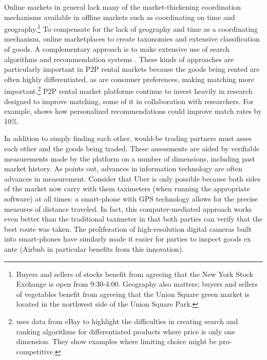 \documentclass[11pt]{article}
\begin{document}
Online markets in general lack many of the market-thickening coordination mechanisms available in offline markets such as coordinating on time and geography.\footnote{
  Buyers and sellers of stocks benefit from agreeing that the New York Stock Exchange is open from 9:30-4:00.
  Geography also matters; buyers and sellers of vegetables benefit from agreeing that the Union Square green market is located in the northwest side of the Union Square Park.
}
To compensate for the lack of geography and time as a coordinating mechanism, online marketplaces to create taxonomies and extensive classification of goods.
A complementary approach is to make extensive use of search algorithms and recommendation systems \citep{resnick1997recommender, adomavicius2005toward}.
These kinds of approaches are particularly important in P2P rental markets because the goods being rented are often highly differentiated, as are consumer preferences, making matching more important.\footnote{
  \cite{dinerstein2014consumer} uses data from eBay to highlight the difficulties in creating search and ranking algorithms for differentiated products where price is only one dimension.
  They show examples where limiting choice might be pro-competitive.
}
P2P rental market platforms continue to invest heavily in research designed to improve matching, some of it in collaboration with researchers. 
For example, \cite{fradkin2013search} shows how personalized recommendations could improve match rates by 10\%. 

In addition to simply finding each other, would-be trading partners must asses each other and the goods being traded. 
These assessments are aided by verifiable measurements made by the platform on a number of dimensions, including past market history. 
As \cite{varian2010computer} points out, advances in information technology are often advances in measurement.  
Consider that Uber is only possible because both sides of the market now carry with them taximeters (when running the appropriate software) at all times: 
a smart-phone with GPS technology allows for the precise measures of distance traveled.
In fact, this computer-mediated approach works even better than the traditional taximeter in that both parties can verify that the best route was taken. 
The proliferation of high-resolution digital cameras built into smart-phones have similarly made it easier for parties to inspect goods ex ante (Airbnb in particular benefits from this innovation).  
\end{document}
